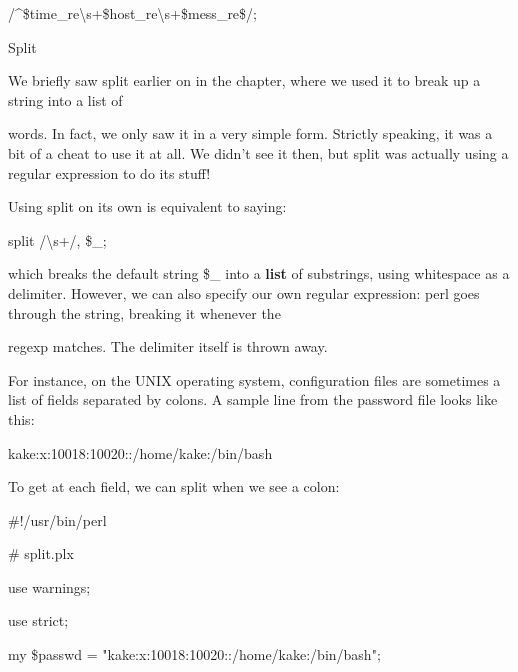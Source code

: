 \documentclass[a4paper,11pt]{book}
\begin{document}
\noindent /\^{}\$time\_re\textbackslash s+\$host\_re\textbackslash s+\$mess\_re\$/;

\noindent 

\noindent 

\noindent Split

\noindent 

\noindent We briefly saw split earlier on in the chapter, where we used it to break up a string into a list of

\noindent words. In fact, we only saw it in a very simple form. Strictly speaking, it was a bit of a cheat to use it at all. We didn't see it then, but split was actually using a regular expression to do its stuff!

\noindent 

\noindent Using split on its own is equivalent to saying:

\noindent 

\noindent split /\textbackslash s+/, \$\_;

\noindent 

\noindent which breaks the default string \$\_ into a \textbf{list }of substrings, using whitespace as a delimiter. However, we can also specify our own regular expression: perl goes through the string, breaking it whenever the

\noindent regexp matches. The delimiter itself is thrown away.

\noindent 

\noindent For instance, on the UNIX operating system, configuration files are sometimes a list of fields separated by colons. A sample line from the password file looks like this:

\noindent 

\noindent 

\noindent kake:x:10018:10020::/home/kake:/bin/bash

\noindent 

\noindent 

\noindent To get at each field, we can split when we see a colon:

\noindent 

\noindent 

\noindent \#!/usr/bin/perl

\noindent \# split.plx

\noindent use warnings;

\noindent use strict;

\noindent 

\noindent my \$passwd = "kake:x:10018:10020::/home/kake:/bin/bash";
\end{document}
